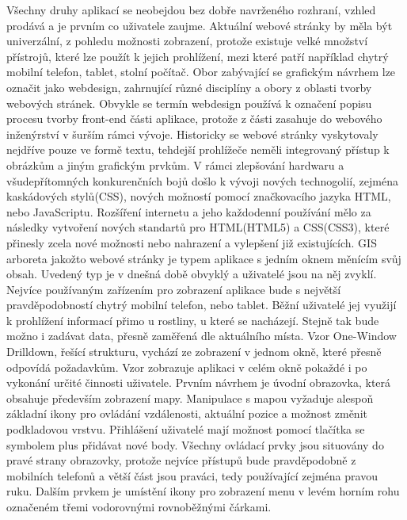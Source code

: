 \documentclass[12pt]{article}%
\begin{document}
{{\newpage
{}
Všechny druhy aplikací se neobejdou bez dobře navrženého rozhraní, vzhled prodává a je prvním co 
uživatele zaujme. Aktuální webové stránky by měla být univerzální, z pohledu možnosti zobrazení, 
protože existuje velké množství přístrojů, které lze použít k jejich prohlížení, mezi které patří 
například chytrý mobilní telefon, tablet, stolní počítač. Obor zabývající se grafickým návrhem lze 
označit jako webdesign, zahrnující různé disciplíny a obory z oblasti tvorby webových stránek. 
Obvykle se termín webdesign používá k označení popisu procesu tvorby front-end části aplikace, 
protože z části zasahuje do webového inženýrství v šurším rámci vývoje. Historicky se webové stránky
vyskytovaly nejdříve pouze ve formě textu, tehdejší prohlížeče neměli integrovaný přístup k obrázkům
a jiným grafickým prvkům. V rámci zlepšování hardwaru a všudepřítomných konkurenčních bojů došlo 
k vývoji nových technogolií, zejména kaskádových stylů(CSS), nových možností pomocí značkovacího 
jazyka HTML, nebo JavaScriptu. Rozšíření internetu a jeho každodenní používání mělo za následky 
vytvoření nových standartů pro HTML(HTML5) a CSS(CSS3), které přinesly zcela nové možnosti nebo
nahrazení a vylepšení již existujících.
GIS arboreta jakožto webové stránky je typem aplikace s jedním oknem měnícím svůj obsah. Uvedený typ
je v dnešná době obvyklý a uživatelé jsou na něj zvyklí. Nejvíce používaným zařízením pro zobrazení 
aplikace bude s největší pravděpodobností chytrý mobilní telefon, nebo tablet. Běžní uživatelé jej 
využijí k prohlížení informací přimo u rostliny, u které se nacházejí. Stejně tak bude možno 
i zadávat data, přesně zaměřená dle aktuálního místa. Vzor One-Window Drilldown, řešící strukturu, 
vychází ze zobrazení v jednom okně, které přesně odpovídá požadavkům. Vzor zobrazuje aplikaci 
v celém okně pokaždé i po vykonání určité činnosti uživatele.
Prvním návrhem je úvodní obrazovka, která obsahuje především zobrazení mapy. Manipulace s mapou 
vyžaduje alespoň základní ikony pro ovládání vzdálenosti, aktuální pozice a možnost změnit 
podkladovou vrstvu. Přihlášení uživatelé mají možnost pomocí tlačítka se symbolem plus přidávat nové 
body. Všechny ovládací prvky jsou situovány do pravé strany obrazovky, protože nejvíce přístupů bude 
pravděpodobně z mobilních telefonů a větší část jsou praváci, tedy používající zejména pravou ruku.
Dalším prvkem je umístění ikony pro zobrazení menu v levém horním rohu označeném třemi vodorovnými
rovnoběžnými čárkami.

\obrazek
{}

}}
\end{document}
